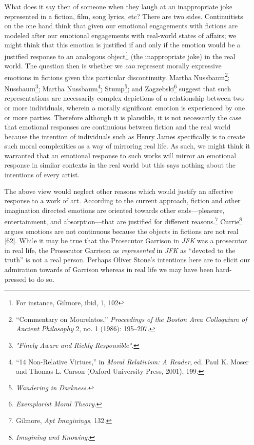 \documentclass[phdthesis,12pt,final]{wuthesis}
\theoremstyle{definition}
\theoremstyle{definition}
\theoremstyle{definition}
\theoremstyle{definition}
\theoremstyle{remark}
\begin{document}
What does it say then of someone when they laugh at an inappropriate joke represented in a fiction, film, song lyrics, etc? There are two sides. Continuitists on the one hand think that given our emotional engagements with fictions are modeled after our emotional engagements with real-world states of affairs; we might think that this emotion is justified if and only if the emotion would be a justified response to an analogous object\footnote{For instance, Gilmore, ibid, 1, 102} (the inappropriate joke) in the real world. The question then is whether we \emph{can} represent morally expressive emotions in fictions given this particular discontinuity. Martha Nussbaum\footnote{{``Commentary on {Mourelatos},''} \emph{Proceedings of the Boston Area Colloquium of Ancient Philosophy} 2, no. 1 (1986): 195--207.}; Nussbaum\footnote{\emph{"{Finely Aware} and {Richly Responsible}"}.}; Martha Nussbaum\footnote{{``14 {Non-Relative Virtues},''} in \emph{Moral {Relativism}: {A Reader}}, ed. Paul K. Moser and Thomas L. Carson (Oxford University Press, 2001), 199.}; Stump\footnote{\emph{Wandering in {Darkness}}.}; and Zagzebski\footnote{\emph{Exemplarist {Moral Theory}}.} suggest that such representations are necessarily complex depictions of a relationship between two or more individuals, wherein a morally significant emotion is experienced by one or more parties. Therefore although it is plausible, it is not necessarily the case that emotional responses are continuious between fiction and the real world because the intention of individuals such as Henry James specifically is to create such moral complexities as a way of mirroring real life. As such, we might think it warranted that an emotional response to such works will mirror an emotional response in similar contexts in the real world but this says nothing about the intentions of every artist.

The above view would neglect other reasons which would justify an affective response to a work of art. According to the current approach, fiction and other imagination directed emotions are oriented towards other ends---pleasure, entertainment, and absorption---that are justified for different reasons.\footnote{Gilmore, \emph{Apt {Imaginings}}, 132.} Currie\footnote{\emph{Imagining and Knowing}.} argues emotions are not continuous because the objects in fictions are not real {[}62{]}. While it may be true that the Prosecutor Garrison in \emph{JFK} was a prosecutor in real life, the Prosecutor Garrison as \emph{represented} in \emph{JFK} as ``devoted to the truth'' is not a real person. Perhaps Oliver Stone's intentions here are to elicit our admiration towards of Garrison whereas in real life we may have been hard-pressed to do so.
\end{document}
